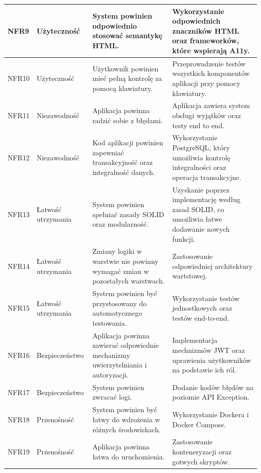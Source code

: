 {\begin{longtable}{|p{1cm}|p{2.5cm}|p{4.5cm}|p{5cm}|}
    \hline
    NFR9 & Użyteczność & System powinien odpowiednio stosować semantykę HTML. & Wykorzystanie odpowiednich znaczników HTML oraz frameworków, które wspierają A11y. \\
    \hline
    NFR10 & Użyteczność & Użytkownik powinien mieć pełną kontrolę za pomocą klawiatury. & Przeprowadzenie testów wszystkich komponentów aplikacji przy pomocy klawiatury. \\
    \hline
    NFR11 & Niezawodność & Aplikacja powinna radzić sobie z błędami. & Aplikacja zawiera system obsługi wyjątków oraz testy end to end. \\
    \hline
    NFR12 & Niezawodność & Kod aplikacji powinien zapewniać transakcyjność oraz integralność danych. & Wykorzystanie PostgreSQL, który umożliwia kontrolę integralności oraz operacja transakcyjne. \\
    \hline
    NFR13 & Łatwość utrzymania & System powinien spełniać zasady SOLID oraz modularność. & Uzyskanie poprzez implementację według zasad SOLID, co umożliwia łatwe dodawanie nowych funkcji. \\
    \hline
    NFR14 & Łatwość utrzymania & Zmiany logiki w warstwie nie powinny wymagać zmian w pozostałych warstwach. &  Zastosowanie odpowiedniej architektury wartstowej. \\
    \hline
    NFR15 & Łatwość utrzymania & System powinien być przystosowany do automatycznego testowania. & Wykorzystanie testów jednostkowych oraz testów end-to-end. \\
    \hline
    NFR16 & Bezpieczeństwo & Aplikacja powinna zawierać odpowiednie mechanizmy uwierzytelniania i autoryzacji. & Implementacja mechnizmów JWT oraz uprawienia użytkowników na podstawie ich ról. \\
    \hline
    NFR17 & Bezpieczeństwo & System powinien zwracać logi. & Dodanie kodów błędów na poziomie API Exception. \\
    \hline
    NFR18 & Przenośność  & System powinien być łatwy do wdrożenia w różnych środowiskach. & Wykorzystanie Dockera i Docker Compose.\\
    \hline
    NFR19 & Przenośność & Aplikacja powinna łatwa do uruchomienia. & Zastosowanie konteneryzacji oraz gotwych skryptów. \\
    \hline
\end{longtable}
}
\normalsize